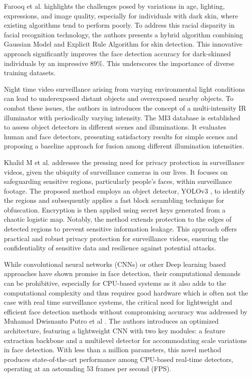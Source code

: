 Farooq et al. \cite{farooq_hybrid_2021} highlights the challenges posed by variations in age, lighting, expressions, and image quality, especially for individuals with dark skin, where existing algorithms tend to perform poorly. To address this racial disparity in facial recognition technology, the authors presents a hybrid algorithm combining Gaussian Model and Explicit Rule Algorithm for skin detection. This innovative approach significantly improves the face detection accuracy for dark-skinned individuals by an impressive 89\%. This underscores the importance of diverse training datasets.

Night time video surveillance arising from varying environmental light conditions can lead to underexposed distant objects and overexposed nearby objects. To combat these issues, the authors in \cite{lu_fusion_2022} introduces the concept of a multi-intensity IR illuminator with periodically varying intensity. The MI3 database is established to assess object detectors in different scenes and illuminations. It evaluates human and face detectors, presenting satisfactory results for simple scenes and proposing a baseline approach for fusion among different illumination intensities.

Khalid M et al. \cite{hosny_privacy_2022} addresses the pressing need for privacy protection in surveillance videos, given the ubiquity of surveillance cameras in our lives. It focuses on safeguarding sensitive regions, particularly people's faces, within surveillance footage. The proposed method employs an object detector, YOLOv3 \cite{aziz_exploring_2020}, to identify the regions and subsequently applies a fast block scrambling technique for obfuscation. Encryption is then applied using secret keys generated from a chaotic logistic map. Notably, the method extends protection to the edges of detected regions to prevent sensitive information leakage. This approach offers practical and robust privacy protection for surveillance videos, ensuring the confidentiality of sensitive data and resilience against potential attacks.

While convolutional neural networks (CNNs) or other Deep learning based approaches have shown promise in face detection, their computational demands can be prohibitive, especially for CPU-based systems as it also adds to the computational complexity and thus requires good hardware which is often not the case with real time surveillance systems, the critical need for lightweight and efficient face detection methods without compromising accuracy was addressed by Muhamad Dwisnanto Putro et al \cite{putro_high_2021}. The authors introduces an optimized architecture, featuring a lightweight CNN with two key modules: a feature extraction backbone and a multilevel detector for accommodating scale variations in face detection. With less than a million parameters, this novel method produces state-of-the-art performance among CPU-based real-time detectors, operating at an astounding 53 frames per second (FPS).
